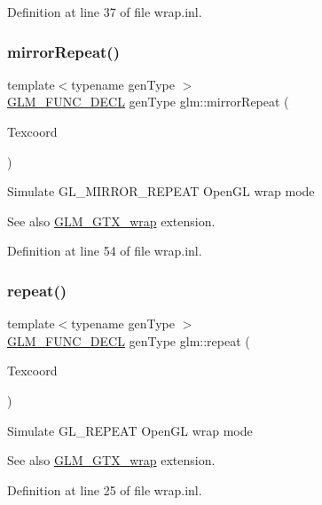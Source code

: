 Definition at line 37 of file wrap.\+inl.

\mbox{\label{group__gtx__wrap_ga16a89b0661b60d5bea85137bbae74d73}} 
\subsubsection{\texorpdfstring{mirrorRepeat()}{mirrorRepeat()}}
{\footnotesize\ttfamily template$<$typename gen\+Type $>$ \\
\mbox{\hyperlink{setup_8hpp_ab2d052de21a70539923e9bcbf6e83a51}{G\+L\+M\+\_\+\+F\+U\+N\+C\+\_\+\+D\+E\+CL}} gen\+Type glm\+::mirror\+Repeat (\begin{DoxyParamCaption}\item[{gen\+Type const \&}]{Texcoord }\end{DoxyParamCaption})}

Simulate G\+L\+\_\+\+M\+I\+R\+R\+O\+R\+\_\+\+R\+E\+P\+E\+AT Open\+GL wrap mode \begin{DoxySeeAlso}{See also}
\mbox{\hyperlink{group__gtx__wrap}{G\+L\+M\+\_\+\+G\+T\+X\+\_\+wrap}} extension. 
\end{DoxySeeAlso}


Definition at line 54 of file wrap.\+inl.

\mbox{\label{group__gtx__wrap_ga809650c6310ea7c42666e918c117fb6f}} 
\subsubsection{\texorpdfstring{repeat()}{repeat()}}
{\footnotesize\ttfamily template$<$typename gen\+Type $>$ \\
\mbox{\hyperlink{setup_8hpp_ab2d052de21a70539923e9bcbf6e83a51}{G\+L\+M\+\_\+\+F\+U\+N\+C\+\_\+\+D\+E\+CL}} gen\+Type glm\+::repeat (\begin{DoxyParamCaption}\item[{gen\+Type const \&}]{Texcoord }\end{DoxyParamCaption})}

Simulate G\+L\+\_\+\+R\+E\+P\+E\+AT Open\+GL wrap mode \begin{DoxySeeAlso}{See also}
\mbox{\hyperlink{group__gtx__wrap}{G\+L\+M\+\_\+\+G\+T\+X\+\_\+wrap}} extension. 
\end{DoxySeeAlso}


Definition at line 25 of file wrap.\+inl.

